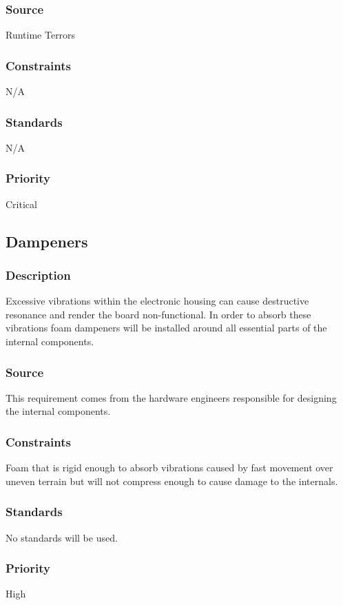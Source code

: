 \subsubsection{Source}
Runtime Terrors
\subsubsection{Constraints}
N/A
\subsubsection{Standards}
N/A
\subsubsection{Priority}
Critical

\subsection{Dampeners}
\subsubsection{Description}
Excessive vibrations within the electronic housing can cause destructive resonance and render the board non-functional. In order to absorb these vibrations foam dampeners will be installed around all essential parts of the internal components.
\subsubsection{Source}
This requirement comes from the hardware engineers responsible for designing the internal components.
\subsubsection{Constraints}
Foam that is rigid enough to absorb vibrations caused by fast movement over uneven terrain but will not compress enough to cause damage to the internals.
\subsubsection{Standards}
No standards will be used.
\subsubsection{Priority}
High
